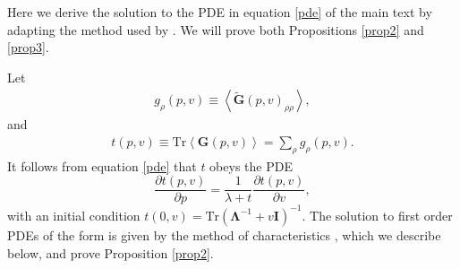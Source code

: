 \documentclass{article}
\begin{document}




Here we derive the solution to the PDE in equation \ref{pde} of the main text by adapting the method used by \cite{sollich1999learning}. We will prove both Propositions \ref{prop2} and \ref{prop3}.

Let 
\begin{align}
    g_\rho(p,v)  \equiv \left< \mathbf{\tilde{G}}(p,v)_{\rho \rho} \right>,
\end{align} 
%
and 
%
\begin{align}\label{tpv}
t(p,v) \equiv \text{Tr} \left< \mathbf{G}(p,v)\right> =  \sum_\rho g_\rho(p,v).
\end{align}
%
It follows from equation \ref{pde} that $t$ obeys the PDE
%
\begin{equation}\label{tpde}
    \frac{\partial t(p,v)}{\partial p} = \frac{1}{\lambda + t} \frac{\partial t(p,v)}{\partial v},
\end{equation}
%
with an initial condition $t(0,v) = \text{Tr}( \mathbf{\Lambda}^{-1} + v \mathbf{I})^{-1}$. The solution to first order PDEs of the form is given by the method of characteristics \cite{garfken67:math}, which we describe below, and prove Proposition \ref{prop2}.
\end{document}
